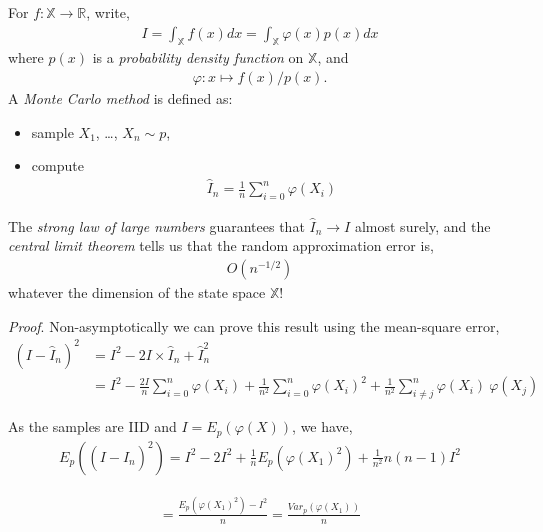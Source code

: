 For \(f:\mathbb{X \rightarrow R}\), write,
\begin{align}
I = \int_{\mathbb{X}}^{}{f(x)}dx = \int_{\mathbb{X}}^{}{\varphi(x)p(x)}dx
\end{align}
where \(p(x)\) is a \emph{probability density function} on \(\mathbb{X}\), and
\begin{align}
\varphi:x \mapsto f(x)/p(x).
\end{align}
A \emph{Monte Carlo method} is defined as:
\begin{itemize}
\item
sample \(X_{1}\), \ldots, \(X_{n} \sim p\),
\item
compute
\begin{align}
{\widehat{I}}_{n} = \frac{1}{n}\sum_{i = 0}^{n}{\varphi(X_{i})}
\end{align}
\end{itemize}
The \emph{strong law of large numbers} guarantees that
\({\widehat{I}}_{n} \rightarrow I\) almost surely, 
and the \emph{central limit theorem} tells us that the random approximation error is,
\begin{align}
O\left(n^{- 1/2}\right)
\end{align}
whatever the dimension of the state space \(\mathbb{X}\)!

\emph{Proof}. 
Non-asymptotically we can prove this result using the mean-square error,
\begin{equation}
\begin{split}
\left( I - {\widehat{I}}_{n} \right)^{2} &= I^{2} - 2I \times {\widehat{I}}_{n} + {\widehat{I}}_{n}^{2} \\
&= I^{2} - \frac{2I}{n}\sum_{i = 0}^{n}{\varphi\left( X_{i} \right)} + \frac{1}{n^{2}}\sum_{i = 0}^{n}{\varphi\left( X_{i} \right)^{2}} + \frac{1}{n^{2}}\sum_{i \neq j}^{n}{\varphi\left( X_{i} \right)\ \varphi(X_{j})}
\end{split}
\end{equation}

As the samples are IID and \(I = E_{p}(\varphi(X))\), we have,
\begin{align}
E_{p}\left( \left( I - {\widehat{I}}_{n} \right)^{2} \right) 
= I^{2} - 2I^{2} + \frac{1}{n}E_{p}\left( \varphi\left( X_{1} \right)^{2} \right) + \frac{1}{n^{2}}n(n - 1)I^{2}\end{align}

\begin{align}= \frac{E_{p}\left( \varphi\left( X_{1} \right)^{2} \right) - I^{2}}{n} = \frac{Var_{p}\left( \varphi\left( X_{1} \right) \right)}{n}\end{align}

